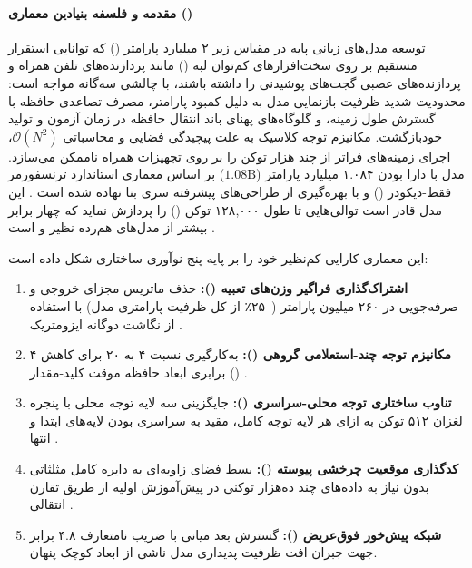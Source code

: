 \item {}

\paragraph*{مقدمه و فلسفه بنیادین معماری ()}
توسعه مدل‌های زبانی پایه در مقیاس زیر ۲ میلیارد پارامتر () که توانایی استقرار مستقیم بر روی سخت‌افزارهای کم‌توان لبه () مانند پردازنده‌های تلفن همراه و پردازنده‌های عصبی گجت‌های پوشیدنی را داشته باشند، با چالشی سه‌گانه مواجه است: محدودیت شدید ظرفیت بازنمایی مدل به دلیل کمبود پارامتر، مصرف تصاعدی حافظه با گسترش طول زمینه، و گلوگاه‌های پهنای باند انتقال حافظه در زمان آزمون و تولید خودبازگشت. مکانیزم توجه کلاسیک \cite{vaswani2017attention} به علت پیچیدگی فضایی و محاسباتی $\mathcal{O}(N^2)$، اجرای زمینه‌های فراتر از چند هزار توکن را بر روی تجهیزات همراه ناممکن می‌سازد. مدل  با دارا بودن ۱.۰۸۴ میلیارد پارامتر ($1.08\text{B}$) بر اساس معماری استاندارد ترنسفورمر فقط-دیکودر () و با بهره‌گیری از طراحی‌های پیشرفته سری  بنا نهاده شده است \cite{touvron2023llama, grattafiori2024llama3}. این مدل قادر است توالی‌هایی تا طول ۱۲۸,۰۰۰ توکن () را پردازش نماید که چهار برابر بیشتر از مدل‌های هم‌رده نظیر  و  است \cite{team2025gemma3, yang2025qwen3}.

این معماری کارایی کم‌نظیر خود را بر پایه پنج نوآوری ساختاری شکل داده است:
\begin{enumerate}
    \item \textbf{اشتراک‌گذاری فراگیر وزن‌های تعبیه ():} حذف ماتریس مجزای خروجی و صرفه‌جویی در ۲۶۰ میلیون پارامتر (~۲۵٪ از کل ظرفیت پارامتری مدل) با استفاده از نگاشت دوگانه ایزومتریک \cite{press2017using, liu2024mobilellm}.
    \item \textbf{مکانیزم توجه چند-استعلامی گروهی ():} به‌کارگیری نسبت ۴ به ۲۰ برای کاهش ۴ برابری ابعاد حافظه موقت کلید-مقدار () \cite{ainslie2023gqa}.
    \item \textbf{تناوب ساختاری توجه محلی-سراسری ():} جایگزینی سه لایه توجه محلی با پنجره لغزان ۵۱۲ توکن به ازای هر لایه توجه کامل، مقید به سراسری بودن لایه‌های ابتدا و انتها \cite{beltagy2020longformer, zaheer2021big}.
    \item \textbf{کدگذاری موقعیت چرخشی پیوسته ():} بسط فضای زاویه‌ای به دایره کامل مثلثاتی بدون نیاز به داده‌های چند ده‌هزار توکنی در پیش‌آموزش اولیه از طریق تقارن انتقالی \cite{su2024roformer}.
    \item \textbf{شبکه پیش‌خور فوق‌عریض ():} گسترش بعد میانی با ضریب نامتعارف ۴.۸ برابر جهت جبران افت ظرفیت پدیداری مدل ناشی از ابعاد کوچک پنهان.
\end{enumerate}

